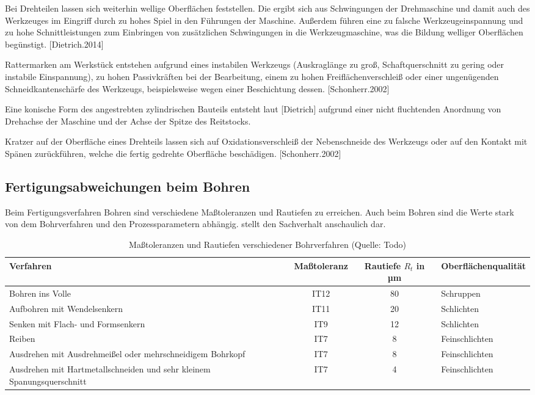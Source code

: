 Bei Drehteilen lassen sich weiterhin wellige Oberflächen feststellen. Die ergibt sich aus Schwingungen der Drehmaschine und damit auch des Werkzeuges im Eingriff durch zu hohes Spiel in den Führungen der Maschine. Außerdem führen eine zu falsche Werkzeugeinspannung und zu hohe Schnittleistungen zum Einbringen von zusätzlichen Schwingungen in die Werkzeugmaschine, was die Bildung welliger Oberflächen begünstigt. [Dietrich.2014] 

Rattermarken am Werkstück entstehen aufgrund eines instabilen Werkzeugs (Auskraglänge zu groß, Schaftquerschnitt zu gering oder instabile Einspannung), zu hohen Passivkräften bei der Bearbeitung, einem zu hohen Freiflächenverschleiß oder einer ungenügenden Schneidkantenschärfe des Werkzeugs, beispielsweise wegen einer Beschichtung dessen. [Schonherr.2002]

Eine konische Form des angestrebten zylindrischen Bauteils entsteht laut [Dietrich] aufgrund einer nicht fluchtenden Anordnung von Drehachse der Maschine und der Achse der Spitze des Reitstocks. 

Kratzer auf der Oberfläche eines Drehteils lassen sich auf Oxidationsverschleiß der Nebenschneide des Werkzeugs oder auf den Kontakt mit Spänen zurückführen, welche die fertig gedrehte Oberfläche beschädigen. [Schonherr.2002] 

\subsection {Fertigungsabweichungen beim Bohren}

Beim Fertigungsverfahren Bohren sind verschiedene Maßtoleranzen und Rautiefen zu erreichen. Auch beim Bohren sind die Werte stark von dem Bohrverfahren und den Prozessparametern abhängig.
 stellt den Sachverhalt anschaulich dar.

\begin{table}[h]	
	
	\begin{tabularx}{\columnwidth}{|X|c|c|l|}	
		
		
		\hline
		\textbf{Verfahren}&\textbf{Maßtoleranz}&\textbf{Rautiefe $R_{t}$ in µm}&\textbf{Oberflächenqualität}\\
		\hline
		Bohren ins Volle&IT12&80&Schruppen\\
		\hline
		Aufbohren mit Wendelsenkern&IT11&20&Schlichten\\
		\hline
		Senken mit Flach- und Form\-senkern&IT9&12&Schlichten\\
		\hline
		Reiben&IT7&8&Feinschlichten\\
		\hline
		Ausdrehen mit Ausdrehmeißel oder mehrschneidigem Bohrkopf&IT7&8&Feinschlichten\\
		\hline
		Ausdrehen mit Hartmetallschneiden und sehr kleinem Spanungsquerschnitt&IT7&4&Feinschlichten\\
		\hline	
		
	\end{tabularx}
	
	\caption{Maßtoleranzen und Rautiefen verschiedener Bohrverfahren (Quelle: Todo)}
	\label{tab:bohrungsqualitaet}

\end{table}

